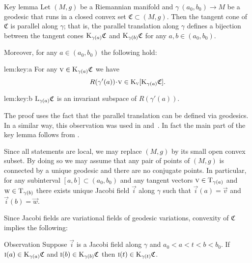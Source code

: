 \documentclass[a4paper,10pt]{article}
\begin{document}
\begin{thm}{Key lemma}\label{lem:key}
Let $(M,g)$ be a Riemannian manifold and $\gamma\:(a_0,b_0)\to M$ be a geodesic that runs in a closed convex set $\mathfrak{C}\subset (M,g)$.
Then the tangent cone of $\mathfrak{C}$ is parallel along $\gamma$; that is, the parallel translation along $\gamma$ defines a bijection between the tangent cones $\mathrm{K}_{\gamma(a)}\mathfrak{C}$ and $\mathrm{K}_{\gamma(b)}\mathfrak{C}$ for any $a,b \in (a_0,b_0)$.

Moreover, for any $a\in (a_0,b_0)$ the following hold:
\begin{subthm}{lem:key:a}
For any $\text{\sc{v}}\in \mathrm{K}_{\gamma(a)}\mathfrak{C}$ we have
\[R(\gamma'(a))\cdot \vec{v}\in \K_\vec{v}[\K_{\gamma(a)}\mathfrak{C}].\]
\end{subthm}

\begin{subthm}{lem:key:b} 
$\mathrm{L}_{\gamma(a)}\mathfrak{C}$ is an invariant subspace of $R(\gamma'(a))$.
\end{subthm}

\end{thm}

The proof uses the fact that the parallel translation can be defined via geodesics.
In a similar way, this observation was used in \cite[Section 13]{Ber-Nik} and~\cite{Petruninpar}.
In fact the main part of the key lemma follows from
\cite{Petruninpar}.

Since all statements are local, we may replace $(M,g)$ by its small open convex subset.
By doing so we may assume that any pair of points of $(M,g)$ is connected by a unique geodesic and there are no conjugate points.
In particular, for any subinterval $[a,b]\subset (a_0,b_0)$ and any tangent vectors $\text{\sc{v}} \in \mathrm{T}_{\gamma (a)}$ and $\text{\sc{w}} \in \mathrm{T}_{\gamma (b)}$ there exists unique Jacobi field $\vec{i}$ along $\gamma$ 
such that $\vec{i}(a)=\vec{v}$ and $\vec{i}(b)=\vec{w}$.

Since Jacobi fields are variational fields of geodesic variations, convexity of $\mathfrak{C}$ implies the following: 

\begin{thm}{Observation}
Suppose $\vec{i}$ is a Jacobi field along %
$\gamma$ and $a_0<a<t<b<b_0$.
If 
$\text{\sc{i}}(a)\in \mathrm{K}_{\gamma(a)}\mathfrak{C}$ and $\text{\sc{i}}(b)\in \mathrm{K}_{\gamma(b)}\mathfrak{C}$
then $\text{\sc{i}}(t)\in \mathrm{K}_{\gamma(t)}\mathfrak{C}$.
\end{thm}%
\end{document}
